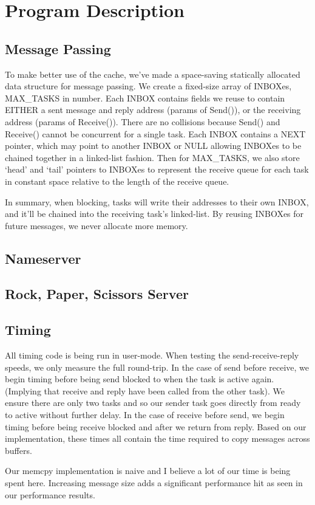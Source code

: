 \documentclass[letterpaper]{article}
\begin{document}
\section{Program Description}

\subsection{Message Passing}

To make better use of the cache, we've made a space-saving statically allocated data structure for message passing. We create a fixed-size array of INBOXes, MAX\_TASKS in number. Each INBOX contains fields we reuse to contain EITHER a sent message and reply address (params of Send()), or the receiving address (params of Receive()). There are no collisions because Send() and Receive() cannot be concurrent for a single task. Each INBOX contains a NEXT pointer, which may point to another INBOX or NULL allowing INBOXes to be chained together in a linked-list fashion. Then for MAX\_TASKS, we also store `head' and `tail' pointers to INBOXes to represent the receive queue for each task in constant space relative to the length of the receive queue.

In summary, when blocking, tasks will write their addresses to their own INBOX, and it'll be chained into the receiving task's linked-list. By reusing INBOXes for future messages, we never allocate more memory.

\subsection{Nameserver}

\subsection{Rock, Paper, Scissors Server}

\subsection{Timing}

All timing code is being run in user-mode. When testing the send-receive-reply speeds, we only measure the full round-trip. In the case of send before receive, we begin timing before being send blocked to when the task is active again. (Implying that receive and reply have been called from the other task). We ensure there are only two tasks and so our sender task goes directly from ready to active without further delay. In the case of receive before send, we begin timing before being receive blocked and after we return from reply. Based on our implementation, these times all contain the time required to copy messages across buffers.

Our memcpy implementation is naive and I believe a lot of our time is being spent here. Increasing message size adds a significant performance hit as seen in our performance results.
\end{document}
